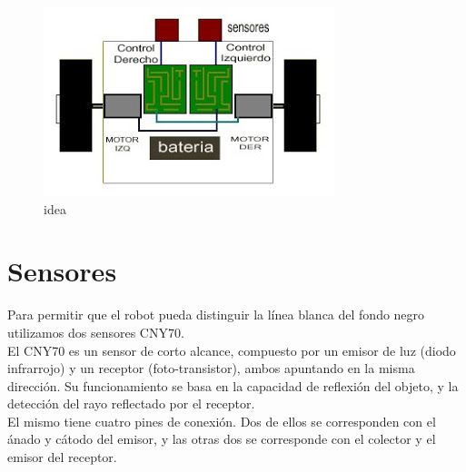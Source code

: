 \documentclass[a4paper]{article}
\begin{document}
\begin{figure}[H]
  \centering
    \includegraphics[width=\textwidth]{./imagenes/autito.jpg}
  \caption{idea}
\end{figure}

\newpage

\section{Sensores}

Para permitir que el robot pueda distinguir la línea blanca del fondo negro utilizamos dos sensores CNY70.\\
El CNY70 es un sensor de corto alcance, compuesto por un emisor de luz (diodo infrarrojo) y un receptor (foto-transistor), ambos apuntando en la misma dirección. Su funcionamiento se basa en la capacidad de reflexión del objeto,
y la detección del rayo reflectado por el receptor.\\

El mismo tiene cuatro pines de conexión. Dos de ellos se corresponden con el ánado y cátodo del emisor, y las otras dos se corresponde con el colector y el emisor del receptor.
\end{document}
